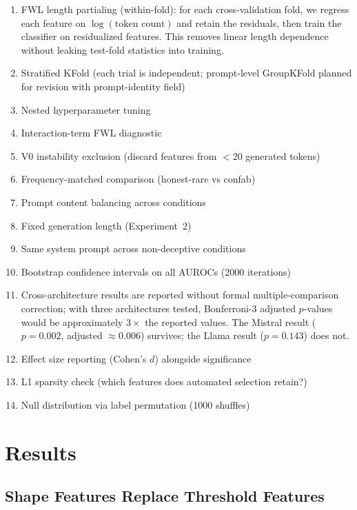 \documentclass[11pt,a4paper]{article}
\begin{document}
\begin{enumerate}
\item FWL length partialing (within-fold): for each cross-validation
  fold, we regress each feature on $\log(\text{token count})$ and
  retain the residuals, then train the classifier on residualized
  features. This removes linear length dependence without leaking
  test-fold statistics into training.
\item Stratified KFold (each trial is independent; prompt-level
  GroupKFold planned for revision with prompt-identity field)
\item Nested hyperparameter tuning
\item Interaction-term FWL diagnostic
\item V0 instability exclusion (discard features from $<$20 generated
  tokens)
\item Frequency-matched comparison (honest-rare vs confab)
\item Prompt content balancing across conditions
\item Fixed generation length (Experiment~2)
\item Same system prompt across non-deceptive conditions
\item Bootstrap confidence intervals on all AUROCs (2000 iterations)
\item Cross-architecture results are reported without formal
  multiple-comparison correction; with three architectures tested,
  Bonferroni-3 adjusted $p$-values would be approximately $3\times$ the
  reported values. The Mistral result ($p = 0.002$, adjusted
  $\approx 0.006$) survives; the Llama result ($p = 0.143$) does not.
\item Effect size reporting (Cohen's $d$) alongside significance
\item L1 sparsity check (which features does automated selection
  retain?)
\item Null distribution via label permutation (1000 shuffles)
\end{enumerate}

\section{Results}
\label{sec:results}

\subsection{Shape Features Replace Threshold Features}
\end{document}
